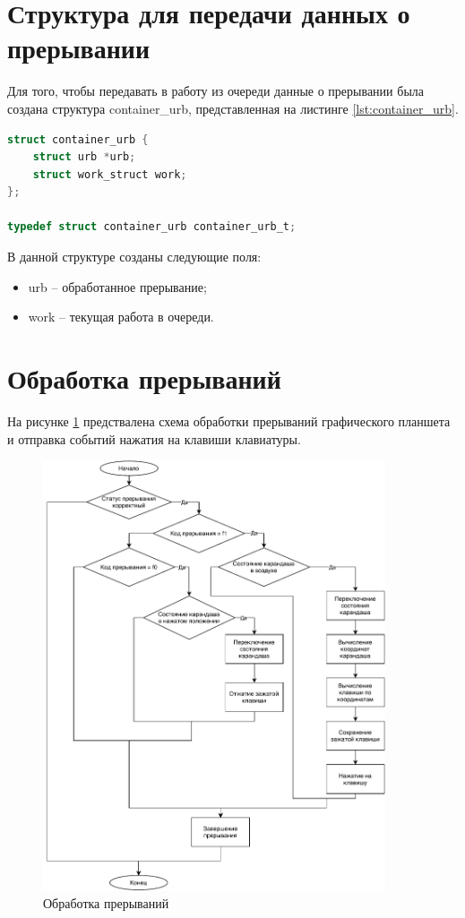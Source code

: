 \section{Структура для передачи данных о прерывании}

Для того, чтобы передавать в работу из очереди данные о прерывании была создана структура container\_urb, представленная на листинге \ref{lst:container_urb}.

\begin{lstlisting}[language=c,caption=Структура для передачи данных о прерывании,label=lst:container_urb]
struct container_urb {
    struct urb *urb;
    struct work_struct work;
};

typedef struct container_urb container_urb_t;
\end{lstlisting}

В данной структуре созданы следующие поля:

\begin{itemize}
    \item urb -- обработанное прерывание;
    \item work -- текущая работа в очереди.
\end{itemize}

\section{Обработка прерываний}

На рисунке \ref{fig:urb} предствалена схема обработки прерываний графического планшета и отправка событий нажатия на клавиши клавиатуры.

\begin{figure}[H]
    \centering
    \includegraphics[width=0.9\textwidth]{img/urb.pdf}
    \caption{Обработка прерываний}
    \label{fig:urb}
\end{figure}

